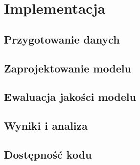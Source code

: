 \section{Implementacja}
\subsection{Przygotowanie danych}

\subsection{Zaprojektowanie modelu}

\subsection{Ewaluacja jakości modelu}

\subsection{Wyniki i analiza}

\subsection{Dostępność kodu}